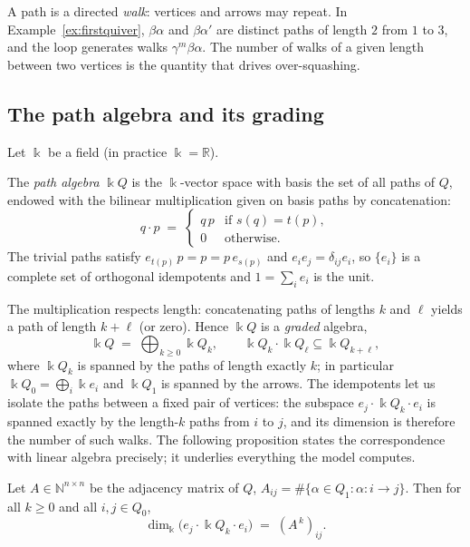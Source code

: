 \documentclass[runningheads]{llncs}
\newcommand{\kk}{\Bbbk}
\newcommand{\kQ}{\kk Q}
\newcommand{\NN}{\mathbb{N}}
\newcommand{\RR}{\mathbb{R}}
\newcommand{\Adj}{A}
\begin{document}
A path is a directed \emph{walk}: vertices and arrows may repeat. In
Example~\ref{ex:firstquiver}, $\beta\alpha$ and $\beta\alpha'$ are distinct
paths of length $2$ from $1$ to $3$, and the loop generates walks
$\gamma^m\beta\alpha$. The number of walks of a given length between two
vertices is the quantity that drives over-squashing.

\subsection{The path algebra and its grading}

Let $\kk$ be a field (in practice $\kk=\RR$).

\begin{definition}
The \emph{path algebra} $\kQ$ is the $\kk$-vector space with basis the set of
all paths of $Q$, endowed with the bilinear multiplication given on basis paths
by concatenation:
\[
  q\cdot p \;=\;
  \begin{cases}
    q\,p & \text{if } s(q)=t(p),\\[2pt]
    0 & \text{otherwise.}
  \end{cases}
\]
The trivial paths satisfy $e_{t(p)}\,p=p=p\,e_{s(p)}$ and
$e_ie_j=\delta_{ij}e_i$, so $\{e_i\}$ is a complete set of orthogonal
idempotents and $1=\sum_i e_i$ is the unit.
\end{definition}

The multiplication respects length: concatenating paths of lengths $k$ and
$\ell$ yields a path of length $k+\ell$ (or zero). Hence $\kQ$ is a
\emph{graded} algebra,
\[
  \kQ \;=\; \bigoplus_{k\ge 0}\kQ_k,
  \qquad \kQ_k\cdot \kQ_\ell \subseteq \kQ_{k+\ell},
\]
where $\kQ_k$ is spanned by the paths of length exactly $k$; in particular
$\kQ_0=\bigoplus_i\kk e_i$ and $\kQ_1$ is spanned by the arrows. The
idempotents let us isolate the paths between a fixed pair of vertices: the
subspace $e_j\cdot\kQ_k\cdot e_i$ is spanned exactly by the length-$k$ paths
from $i$ to $j$, and its dimension is therefore the number of such walks. The
following proposition states the correspondence with linear algebra precisely;
it underlies everything the model computes.

\begin{proposition}\label{prop:count}
Let $\Adj\in\NN^{n\times n}$ be the adjacency matrix of $Q$,
$\Adj_{ij}=\#\{\alpha\in Q_1:\alpha\colon i\to j\}$. Then for all $k\ge0$ and
all $i,j\in Q_0$,
\[
  \dim_{\kk}\bigl(e_j\cdot \kQ_k\cdot e_i\bigr) \;=\; (\Adj^{\,k})_{ij}.
\]
\end{proposition}
\end{document}
